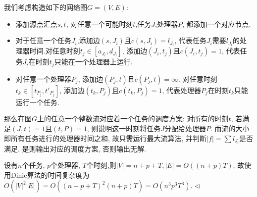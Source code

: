 \documentclass[11pt]{article}
\newenvironment{answer}[1][Answer]{\begin{trivlist}
\item[\hskip \labelsep{\bfseries\itshape#1.}\hskip \labelsep]}{\hfill$\lhd$\end{trivlist}}
\begin{document}
\begin{answer}
    我们考虑构造如下的网络图$G = (V,E)$: 
    \begin{itemize}
        \item 添加源点汇点$s,t$, 对任意一个可能时刻$t$,任务$J$,处理器$P$, 都添加一个对应节点.
        \item 对于任意一个任务$J_i$,添加边$(s,J_i)$且$c(s,J_i) = l_{J_i}$, 代表任务$J_i$需要$l_{J_i}$的处理器时间.对任意时刻$t_j \in [a_{J_i}, d_{J_i}]$, 添加边$(J_i, t_j)$且$c(J_i, t_j) = 1$, 代表任务$J_i$在时刻$t_j$只能在一个处理器上运行.
        \item 对任意一个处理器$P_j$, 添加边$(P_j, t)$且$c(P_j, t) = \infty$. 对任意时刻$t_k \in [t_{P_j}, t'_{P_j}]$, 添加边$(t_k, P_j)$且$c(t_k, P_j) = 1$, 代表处理器$P_j$在时刻$t_k$只能运行一个任务.
    \end{itemize}
    那么在图$G$上的任意一个整数流对应着一个任务的调度方案: 对所有的时刻$t$, 若满足$(J,t) = 1 $且$ (t,P) = 1$, 则说明这一时刻将任务$J$分配给处理器$P$. 而流的大小即所有任务进行的处理器时间之和, 故只需运行最大流算法, 并判断$|f| = \sum l_{J_i}$是否满足. 是则输出对应的调度方案, 否则输出无解. 

    设有$n$个任务, $p$个处理器, $T$个时刻,则$|V| = n+p+T, |E| = O((n+p)T) $, 故使用Dinic算法的时间复杂度为$O(|V|^2|E|) = O((n+p+T)^2(n+p)T) = O(n^3p^3T^3) $.
\end{answer}
\end{document}
